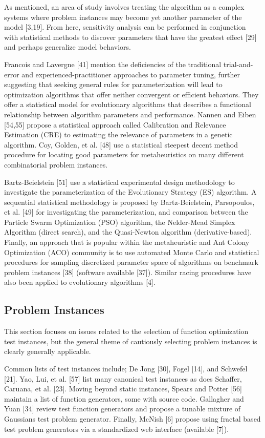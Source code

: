 \documentclass[a4paper, 11pt]{article}
\begin{document}
As mentioned, an area of study involves treating the algorithm as a complex systems where problem instances may become yet another parameter of the model [3,19]. From here, sensitivity analysis can be performed in conjunction with statistical methods to discover parameters that have the greatest effect [29] and perhaps generalize model behaviors.

Francois and Lavergne [41] mention the deficiencies of the traditional trial-and-error and experienced-practitioner approaches to parameter tuning, further suggesting	that seeking general rules for parameterization will lead to optimization algorithms that offer neither convergent or efficient behaviors. They offer a statistical model for evolutionary algorithms that describes a functional relationship between algorithm parameters and performance. Nannen and Eiben [54,55] propose a statistical approach called Calibration and Relevance Estimation (CRE) to estimating the relevance of parameters in a genetic algorithm. Coy, Golden, et al. [48] use a statistical steepest decent method procedure for locating good parameters for metaheuristics on many different combinatorial problem instances.

Bartz-Beielstein [51] use a statistical experimental design methodology to investigate the parameterization of the Evolutionary Strategy (ES) algorithm. A sequential statistical methodology is proposed by Bartz-Beielstein, Parsopoulos, et al. [49] for investigating the parameterization, and comparison between the Particle Swarm Optimization (PSO) algorithm, the Nelder-Mead Simplex Algorithm (direct search), and the Quasi-Newton algorithm (derivative-based). Finally, an approach that is popular within the metaheuristic and Ant Colony Optimization (ACO) community is to use automated Monte Carlo and statistical procedures for sampling discretized parameter space of algorithms on benchmark problem instances [38] (software available [37]). Similar racing procedures have also been applied to evolutionary algorithms [4].

% 
% 
\subsection{Problem Instances}
This section focuses on issues related to the selection of function optimization test instances, but the general theme of cautiously selecting problem instances is clearly generally applicable.

Common lists of test instances include; De Jong [30], Fogel [14], and Schwefel [21]. Yao, Lui, et al. [57] list many canonical test instances as does Schaffer, Caruana, et al. [23]. Moving beyond static instances, Spears and Potter [56] maintain a list of function generators, some with source code. Gallagher and Yuan [34] review test function generators and propose a tunable mixture of Gaussians test problem generator. Finally, McNish [6] propose using fractal based test problem generators via a standardized web interface (available [7]).
\end{document}
